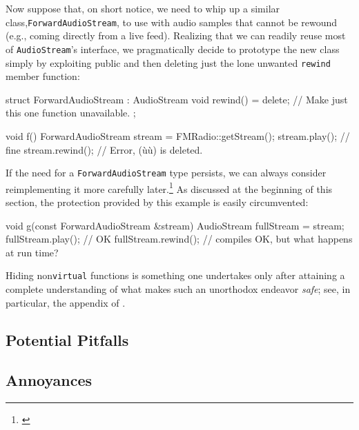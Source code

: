 Now suppose that, on short notice, we need to whip up a similar
class,\linebreak[4] \lstinline!ForwardAudioStream!, to use with audio samples that
cannot be rewound (e.g., coming directly from a live feed). Realizing
that we can readily reuse most of \lstinline!AudioStream!'s interface, we
pragmatically decide to prototype the new class simply by exploiting
public  and then deleting just the lone
unwanted \lstinline!rewind! member function:

\begin{emcppslisting}[emcppsbatch=e2]
struct ForwardAudioStream : AudioStream
{
    void rewind() = delete; // Make just this one function unavailable.
};

void f()
{
    ForwardAudioStream stream = FMRadio::getStream();
    stream.play();   // fine
    stream.rewind(); // Error, (ù{}ù) is deleted.
}
\end{emcppslisting}

\noindent If the need for a \lstinline!ForwardAudioStream! type persists, we can always
consider reimplementing it more carefully later.{\cprotect\footnote{\cite[sections 3.5.10.5 and 3.7.3, pp.~687--703 and 726--727]{lakos20}}} As discussed at the beginning of this section, the protection provided by this example is easily circumvented:
\begin{emcppslisting}[emcppsbatch=e2]
void g(const ForwardAudioStream &stream)
{
    AudioStream fullStream = stream;
    fullStream.play();   // OK
    fullStream.rewind(); // compiles OK, but what happens at run time?
}
\end{emcppslisting}

\noindent Hiding non\lstinline!virtual! functions is something one undertakes only after attaining a complete understanding of what makes such an unorthodox endeavor \emph{safe}; see, in particular, the appendix of .

\subsection[Potential Pitfalls]{Potential Pitfalls}\label{potential-pitfalls}

\hspace*{\fill}

\subsection[Annoyances]{Annoyances}\label{annoyances}

